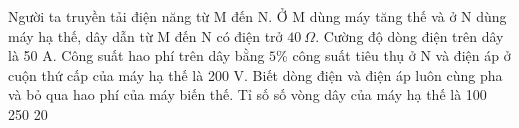 \begin{vidu} %
	Người ta truyền tải điện năng từ M đến N. Ở M dùng máy tăng thế và ở N dùng máy hạ thế, dây dẫn từ M đến N có điện trở $40\ \Omega $. Cường độ dòng điện trên dây là 50 A. Công suất hao phí trên dây bằng $5\%$ công suất tiêu thụ ở N và điện áp ở cuộn thứ cấp của máy hạ thế là 200 V. Biết dòng điện và điện áp luôn cùng pha và bỏ qua hao phí của máy biến thế. Tỉ số số vòng dây của máy hạ thế là
	\choice
	{100}
	{250}
	{}
	{20}
\end{vidu}
